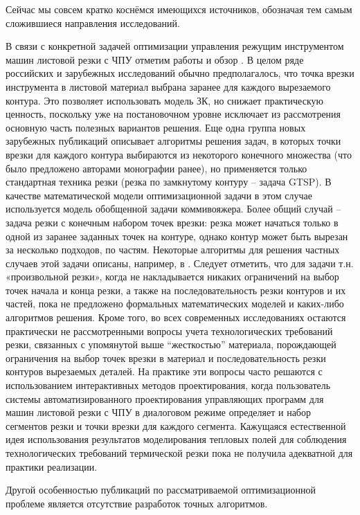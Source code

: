 \documentclass[12pt]{report}
\begin{document}
Сейчас мы совсем кратко коснёмся имеющихся источников,
обозначая тем самым сложившиеся направления исследований.

В связи с конкретной задачей оптимизации управления
режущим инструментом машин листовой резки с ЧПУ
отметим работы
\cite{intro03,intro04,intro05,intro06,intro07,intro08,intro09,Cha10`,intro11,intro12}
и обзор \cite{intro13}.
В целом ряде российских и зарубежных исследований обычно предполагалось,
что точка врезки инструмента в листовой материал
выбрана заранее для каждого вырезаемого контура.
Это позволяет использовать модель ЗК,
но снижает практическую ценность,
поскольку уже на постановочном уровне
исключает из рассмотрения основную часть
полезных вариантов решения.
Еще одна группа новых зарубежных публикаций
описывает алгоритмы решения задач,
в которых точки врезки для каждого контура
выбираются из некоторого конечного множества
(что было предложено авторами монографии ранее),
но применяется только стандартная техника резки
(резка по замкнутому контуру – задача GTSP).
В качестве математической модели оптимизационной задачи
в этом случае используется модель обобщенной задачи коммивояжера.
Более общий случай – задача резки с конечным набором точек врезки:
резка может начаться только в одной из заранее заданных точек на контуре,
однако контур может быть вырезан за несколько подходов,
по частям.
Некоторые алгоритмы для решения частных случаев
этой задачи описаны, например,
в \cite{intro12,intro14}.
Следует отметить, что для задачи т.н. «произвольной резки»,
когда не накладывается никаких ограничений
на выбор точек начала и конца резки,
а также на последовательность резки контуров и их частей,
пока не предложено формальных математических моделей
и каких-либо алгоритмов решения.
Кроме того, во всех современных исследованиях
остаются практически не рассмотренными
вопросы учета технологических требований резки,
связанных с упомянутой выше “жесткостью” материала,
порождающей ограничения на выбор точек врезки в материал
и последовательность резки контуров вырезаемых деталей.
На практике эти вопросы часто решаются
с использованием интерактивных методов проектирования,
когда пользователь системы автоматизированного проектирования
управляющих программ для машин листовой резки с ЧПУ
в диалоговом режиме определяет и набор сегментов резки
и точки врезки для каждого сегмента.
Кажущаяся естественной идея использования результатов
моделирования тепловых полей для соблюдения
технологических требований термической резки
пока не получила адекватной для практики реализации.

Другой особенностью публикаций
по рассматриваемой оптимизационной проблеме
является отсутствие разработок точных алгоритмов.
\end{document}
